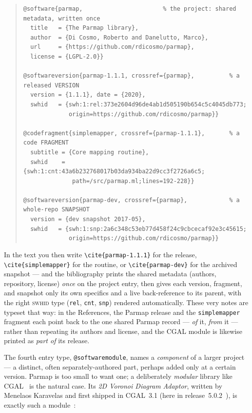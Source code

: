\begin{quote}\footnotesize
\begin{verbatim}
@software{parmap,                       % the project: shared metadata, written once
  title   = {The Parmap library},
  author  = {Di Cosmo, Roberto and Danelutto, Marco},
  url     = {https://github.com/rdicosmo/parmap},
  license = {LGPL-2.0}}

@softwareversion{parmap-1.1.1, crossref={parmap},          % a released VERSION
  version = {1.1.1}, date = {2020},
  swhid   = {swh:1:rel:373e2604d96de4ab1d505190b654c5c4045db773;
             origin=https://github.com/rdicosmo/parmap}}

@codefragment{simplemapper, crossref={parmap-1.1.1},       % a code FRAGMENT
  subtitle = {Core mapping routine},
  swhid    = {swh:1:cnt:43a6b232768017b03da934ba22d9cc3f2726a6c5;
              path=/src/parmap.ml;lines=192-228}}

@softwareversion{parmap-dev, crossref={parmap},            % a whole-repo SNAPSHOT
  version = {dev snapshot 2017-05},
  swhid   = {swh:1:snp:2a6c348c53eb77d458f24c9cbcecaf92e3c45615;
             origin=https://github.com/rdicosmo/parmap}}
\end{verbatim}
\end{quote}

\noindent In the text you then write \texttt{\textbackslash cite\{parmap-1.1.1\}} for the release,
\texttt{\textbackslash cite\{simplemapper\}} for the routine, or \texttt{\textbackslash cite\{parmap-dev\}}
for the archived snapshot --- and the bibliography prints the shared metadata (authors, repository,
license) \emph{once} on the project entry, then gives each version, fragment, and snapshot only its
own specifics and a live back-reference to its parent, with the right \textsc{swhid} type
(\texttt{rel}, \texttt{cnt}, \texttt{snp}) rendered automatically. These very notes are typeset that
way: in the References, the Parmap release and the \texttt{simplemapper} fragment each point back to
the one shared Parmap record --- \emph{of} it, \emph{from} it --- rather than repeating its authors
and license, and the CGAL module is likewise printed as \emph{part of} its release.

\noindent The fourth entry type, \texttt{@softwaremodule}, names a \emph{component} of a larger
project --- a distinct, often separately-authored part, perhaps added only at a certain version.
Parmap is too small to want one; a deliberately \emph{modular} library like CGAL~\autocite{cgal}
is the natural case. Its \emph{2D Voronoi Diagram Adaptor}, written by Menelaos Karavelas and first
shipped in CGAL~3.1 (here in release~5.0.2~\autocite{cgal-5-0-2}), is exactly such a
module~\autocite{cgal-voronoi}:

